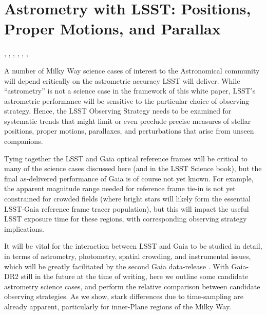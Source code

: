 %
%
%

\section{Astrometry with LSST: Positions, Proper Motions, and Parallax}
\def\secname{MW_Astrometry}\label{sec:\secname}

, , , , , , 

A number of Milky Way science cases of interest to the Astronomical
community will depend critically on the astrometric accuracy LSST will
deliver. While ``astrometry'' is not a science case in the framework
of this white paper, LSST's astrometric performance will be sensitive
to the particular choice of observing strategy.
Hence, the LSST Observing Strategy needs to be examined for systematic
trends that might limit or even preclude precise measures of
stellar positions, proper motions, parallaxes, and perturbations that
arise from unseen companions.

Tying together the LSST and Gaia optical reference frames will be
critical to many of the science cases discussed here (and in the LSST
Science book), but the final as-delivered performance of Gaia is of
course not yet known. For example, the apparent magnitude range needed
for reference frame tie-in is not yet constrained for crowded fields
(where bright stars will likely form the essential LSST-Gaia reference
frame tracer population), but this will impact the useful LSST
exposure time for these regions, with corresponding observing strategy
implications.

It will be vital for the interaction between LSST and Gaia to be
studied in detail, in terms of astrometry, photometry, spatial
crowding, and instrumental issues, which will be greatly facilitated
by the second Gaia data-release
\citep[e.g.][]{2016AA...595A...1G}. With Gaia-DR2 still in the future
at the time of writing, here we outline some candidate astrometry
science cases, and perform the relative comparison between candidate
observing strategies. As we show, stark differences due to
time-sampling are already apparent, particularly for inner-Plane
regions of the Milky Way.

